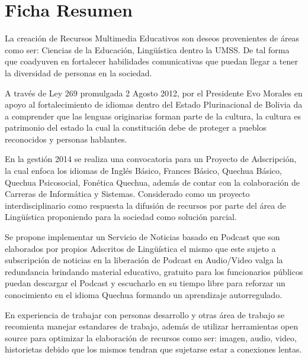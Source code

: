 \chapter*{Ficha Resumen}

La creación de Recursos Multimedia Educativos son deseos provenientes de 
\'{a}reas como ser: Ciencias de la Educaci\'{o}n, Ling\"{u}\'{i}stica dentro la
UMSS.
De tal forma que coadyuven en fortalecer habilidades comunicativas que puedan 
llegar a tener la diversidad de personas en la sociedad.

A trav\'{e}s de Ley 269 promulgada 2 Agosto 2012, por el Presidente Evo Morales
en apoyo al fortalecimiento de idiomas dentro del Estado Plurinacional de 
Bolivia da a comprender que las lenguas originarias forman parte de la cultura,
la cultura es patrimonio del estado la cual la constitución debe de proteger a
pueblos reconocidos y personas hablantes.

En la gesti\'{o}n 2014 se realiza una convocatoria para un Proyecto de 
Adscripci\'{o}n, la cual enfoca los idiomas de Ingl\'{e}s B\'{a}sico, Frances
B\'{a}sico, Quechua B\'{a}sico, Quechua Psicosocial, Fon\'{e}tica Quechua, 
adem\'{a}s de contar con la colaboraci\'{o}n de Carreras de Inform\'{a}tica y
Sistemas. Considerado como un proyecto interdisciplinario como respuesta la
difusi\'{o}n de recursos por parte del \'{a}rea de Ling\"{u}\'{i}stica 
proponiendo para la sociedad como soluci\'{o}n parcial.

Se propone implementar un Servicio de Noticias basado en Podcast que son 
elaborados por propios Adscritos de Ling\"{u}\'{i}stica el mismo que este sujeto
a subscripci\'{o}n de noticias en la liberaci\'{o}n de Podcast en Audio/Video 
valga la redundancia brindando material educativo, gratuito para los funcionarios
p\'{u}blicos puedan descargar el Podcast y escucharlo en su tiempo libre para 
reforzar un conocimiento en el idioma Quechua formando un aprendizaje 
autorregulado.

En experiencia de trabajar con personas desarrollo y otras \'{a}rea de trabajo 
se recomienta manejar estandares de trabajo, adem\'{a}s de utilizar herramientas
open source para optimizar la elaboraci\'{o}n de recursos como ser: imagen, audio,
video, historietas debido que los mismos tendran que sujetarse estar a conexiones
lentas.